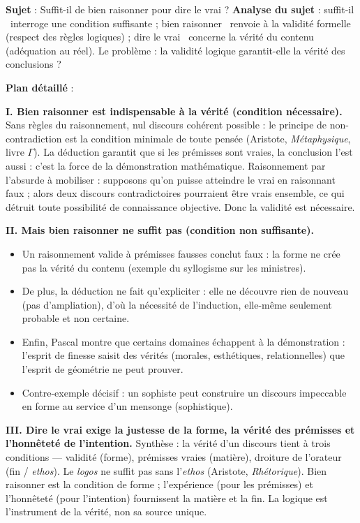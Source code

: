 \documentclass[11pt]{article}
\begin{document}
\begin{exoresolu}
\textbf{Sujet} : Suffit-il de bien raisonner pour dire le vrai ?
\tcblower
\textbf{Analyse du sujet} : \guillemotleft suffit-il \guillemotright\ interroge une condition suffisante ; \guillemotleft bien raisonner \guillemotright\ renvoie à la validité formelle (respect des règles logiques) ; \guillemotleft dire le vrai \guillemotright\ concerne la vérité du contenu (adéquation au réel). Le problème : la validité logique garantit-elle la vérité des conclusions ?

\textbf{Plan détaillé} :

\textbf{I. Bien raisonner est indispensable à la vérité (condition nécessaire).}
Sans règles du raisonnement, nul discours cohérent possible : le principe de non-contradiction est la condition minimale de toute pensée (Aristote, \emph{Métaphysique}, livre $\Gamma$). La déduction garantit que si les prémisses sont vraies, la conclusion l'est aussi : c'est la force de la démonstration mathématique. Raisonnement par l'absurde à mobiliser : supposons qu'on puisse atteindre le vrai en raisonnant faux ; alors deux discours contradictoires pourraient être vrais ensemble, ce qui détruit toute possibilité de connaissance objective. Donc la validité est nécessaire.

\textbf{II. Mais bien raisonner ne suffit pas (condition non suffisante).}
\begin{itemize}
\item Un raisonnement valide à prémisses fausses conclut faux : la forme ne crée pas la vérité du contenu (exemple du syllogisme sur les ministres).
\item De plus, la déduction ne fait qu'expliciter : elle ne découvre rien de nouveau (pas d'ampliation), d'où la nécessité de l'induction, elle-même seulement probable et non certaine.
\item Enfin, Pascal montre que certains domaines échappent à la démonstration : l'esprit de finesse saisit des vérités (morales, esthétiques, relationnelles) que l'esprit de géométrie ne peut prouver.
\item Contre-exemple décisif : un sophiste peut construire un discours impeccable en forme au service d'un mensonge (sophistique).
\end{itemize}

\textbf{III. Dire le vrai exige la justesse de la forme, la vérité des prémisses et l'honnêteté de l'intention.}
Synthèse : la vérité d'un discours tient à trois conditions — validité (forme), prémisses vraies (matière), droiture de l'orateur (fin / \emph{ethos}). Le \emph{logos} ne suffit pas sans l'\emph{ethos} (Aristote, \emph{Rhétorique}). Bien raisonner est la condition de forme ; l'expérience (pour les prémisses) et l'honnêteté (pour l'intention) fournissent la matière et la fin. La logique est l'instrument de la vérité, non sa source unique.
\end{exoresolu}
\end{document}
